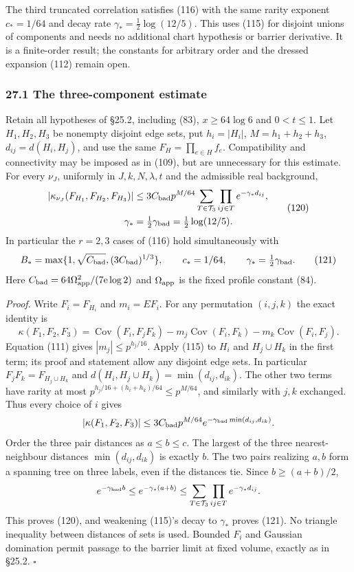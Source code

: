 \documentclass[11pt,a4paper]{article}
\begin{document}
The third truncated correlation satisfies (116) with the same rarity
exponent \(c_*=1/64\) and decay rate \(\gamma_*=\frac12\log(12/5)\).
This uses (115) for disjoint unions of components and needs no
additional chart hypothesis or barrier derivative. It is a finite-order
result; the constants for arbitrary order and the dressed expansion
(112) remain open.

\hypertarget{the-three-component-estimate}{%
\subsubsection{27.1 The three-component
estimate}\label{the-three-component-estimate}}

Retain all hypotheses of §25.2, including (83), \(x\ge64\log6\) and
\(0<t\le1\). Let \(H_1,H_2,H_3\) be nonempty disjoint edge sets, put
\(h_i=|H_i|\), \(M=h_1+h_2+h_3\), \(d_{ij}=d(H_i,H_j)\), and use the
same \(F_H=\prod_{e\in H}f_e\). Compatibility and connectivity may be
imposed as in (109), but are unnecessary for this estimate. For every
\(\nu_J\), uniformly in \(J,k,N,\lambda,t\) and the admissible real
background, \[\begin{aligned}
|\kappa_{\nu_J}(F_{H_1},F_{H_2},F_{H_3})|
&\le 3C_{\rm bad}p^{M/64}
 \sum_{T\in\mathcal T_3}\prod_{ij\in T}e^{-\gamma_*d_{ij}},\\
\gamma_*&=\tfrac12\gamma_{\rm bad}=\tfrac12\log(12/5).
\end{aligned}\tag{120}\] In particular the \(r=2,3\) cases of (116) hold
simultaneously with
\[B_*=\max\{1,\sqrt{C_{\rm bad}},(3C_{\rm bad})^{1/3}\},
\qquad c_*=1/64,\qquad\gamma_*=\tfrac12\gamma_{\rm bad}.\tag{121}\] Here
\(C_{\rm bad}=64\Omega_{\rm app}^2/(7\mathrm e\log2)\) and
\(\Omega_{\rm app}\) is the fixed profile constant (84).

\emph{Proof.} Write \(F_i=F_{H_i}\) and \(m_i=EF_i\). For any
permutation \((i,j,k)\) the exact identity is \[\kappa(F_1,F_2,F_3)
=\operatorname{Cov}(F_i,F_jF_k)
 -m_j\operatorname{Cov}(F_i,F_k)
 -m_k\operatorname{Cov}(F_i,F_j).\tag{122}\] Equation (111) gives
\(|m_j|\le p^{h_j/16}\). Apply (115) to \(H_i\) and \(H_j\cup H_k\) in
the first term; its proof and statement allow any disjoint edge sets. In
particular \(F_jF_k=F_{H_j\cup H_k}\) and
\(d(H_i,H_j\cup H_k)=\min(d_{ij},d_{ik})\). The other two terms have
rarity at most \(p^{h_j/16+(h_i+h_k)/64}\le p^{M/64}\), and similarly
with \(j,k\) exchanged. Thus every choice of \(i\) gives
\[|\kappa(F_1,F_2,F_3)|
\le3C_{\rm bad}p^{M/64}
 e^{-\gamma_{\rm bad}\min(d_{ij},d_{ik})}.\] Order the three pair
distances as \(a\le b\le c\). The largest of the three nearest-neighbour
distances \(\min(d_{ij},d_{ik})\) is exactly \(b\). The two pairs
realizing \(a,b\) form a spanning tree on three labels, even if the
distances tie. Since \(b\ge(a+b)/2\), \[e^{-\gamma_{\rm bad}b}
\le e^{-\gamma_*(a+b)}
\le\sum_{T\in\mathcal T_3}\prod_{ij\in T}e^{-\gamma_*d_{ij}}.\] This
proves (120), and weakening (115)'s decay to \(\gamma_*\) proves (121).
No triangle inequality between distances of sets is used. Bounded
\(F_i\) and Gaussian domination permit passage to the barrier limit at
fixed volume, exactly as in §25.2. \(\square\)
\end{document}
